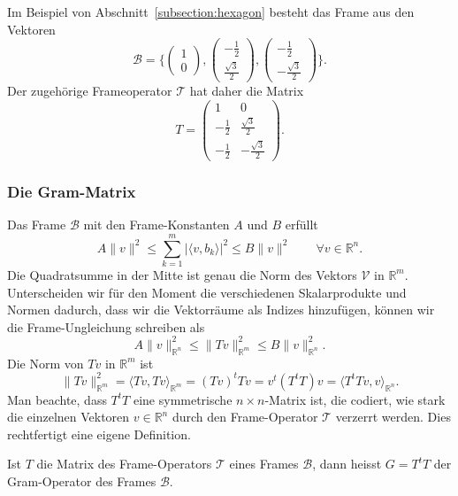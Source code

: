\begin{beispiel}
Im Beispiel von Abschnitt~\ref{subsection:hexagon} besteht das Frame
aus den Vektoren
\[
\mathcal{B}
=
\biggl\{
\begin{pmatrix}1\\[2pt] 0\end{pmatrix},
\begin{pmatrix}-\frac12\\[2pt] \frac{\sqrt{3}}2\end{pmatrix},
\begin{pmatrix}-\frac12\\[2pt] -\frac{\sqrt{3}}2\end{pmatrix}
\biggr\}.
\]
Der zugehörige Frameoperator $\mathcal{T}$ hat daher die Matrix
\begin{equation}
T
=
\begin{pmatrix}
1&0\\[2pt]
-\frac12&\frac{\sqrt{3}}2\\[2pt]
-\frac12&-\frac{\sqrt{3}}2
\end{pmatrix}.
\label{beispielTmatrix}
\end{equation}
\end{beispiel}

\subsubsection{Die Gram-Matrix}
Das Frame $\mathcal{B}$ mit den Frame-Konstanten $A$ und $B$ erfüllt
\[
A\|v\|^2 \le \sum_{k=1}^m |\langle v,b_k\rangle|^2 \le B\|v\|^2
\qquad\forall v\in \mathbb R^n.
\]
Die Quadratsumme in der Mitte ist genau die Norm des Vektors
$\mathcal{V}$ in $\mathbb R^m$.
Unterscheiden wir für den Moment die verschiedenen Skalarprodukte
und Normen dadurch, dass wir die Vektorräume als Indizes hinzufügen,
können wir die Frame-Ungleichung schreiben als
\[
A \| v\|_{\mathbb R^n}^2
\le
\| Tv\|_{\mathbb R^m}^2
\le
B \| v\|_{\mathbb R^n}^2.
\]
Die Norm von $Tv$ in $\mathbb R^m$ ist
\[
\| Tv\|_{\mathbb R^m}^2
=
\langle Tv,Tv\rangle_{\mathbb R^m}
=
(Tv)^tTv
=
v^t(T^tT)v
=
\langle T^tTv,v\rangle_{\mathbb R^n}.
\]
Man beachte, dass $T^tT$ eine symmetrische $n\times n$-Matrix ist,
die codiert, wie stark die einzelnen Vektoren $v\in\mathbb R^n$ durch
den Frame-Operator $\mathcal{T}$ verzerrt werden.
Dies rechtfertigt eine eigene Definition.

\begin{definition}
Ist $T$ die Matrix des Frame-Operators $\mathcal{T}$ eines Frames
$\mathcal{B}$, dann heisst $G=T^tT$ der Gram-Operator des Frames
$\mathcal{B}$.
\end{definition}


